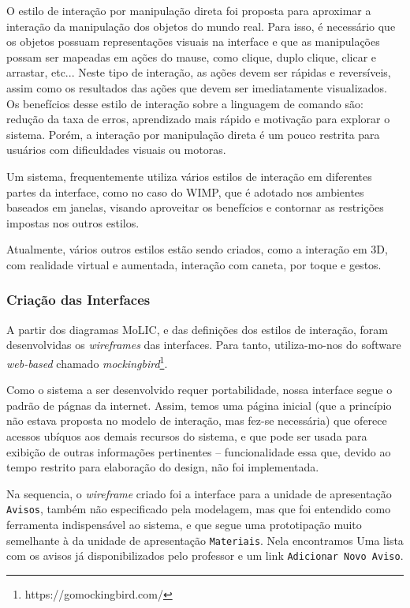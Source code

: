 	O estilo de interação por manipulação direta foi proposta para aproximar a
interação da manipulação dos objetos do mundo real. Para isso, é necessário que
os objetos possuam representações visuais na interface e que as manipulações
possam ser mapeadas em ações do mause, como clique, duplo clique, clicar e
arrastar, etc... Neste tipo de interação, as ações devem ser rápidas e
reversíveis, assim como os resultados das ações que devem ser imediatamente
visualizados. Os benefícios desse estilo de interação sobre a linguagem de
comando são: redução da taxa de erros, aprendizado mais rápido e motivação para
explorar o sistema. Porém, a interação por manipulação direta é um pouco
restrita para usuários com dificuldades visuais ou motoras.

	Um sistema, frequentemente utiliza vários estilos de interação em diferentes
partes da interface, como no caso do WIMP, que é adotado nos ambientes baseados
em janelas, visando aproveitar os benefícios e contornar as restrições impostas
nos outros estilos.

	Atualmente, vários outros estilos estão sendo criados, como a interação em 3D,
com realidade virtual e aumentada, interação com caneta, por toque e gestos.


		\subsubsection{Criação das Interfaces}
			A partir dos diagramas MoLIC, e das definições dos estilos de interação, 
			foram desenvolvidas os \emph{wireframes} das interfaces. Para tanto, utiliza-mo-nos
			do software \emph{web-based} chamado \emph{mockingbird}\footnote{https://gomockingbird.com/}.
			
			Como o sistema a ser desenvolvido requer portabilidade, nossa 
			interface segue o padrão de págnas da internet. Assim, temos uma página 
			inicial (que a princípio não estava proposta no modelo de interação, mas fez-se
			necessária) que oferece acessos ubíquos aos demais recursos do sistema, e que 
			pode ser usada para exibição de outras informações pertinentes -- funcionalidade essa que, devido ao 
			tempo restrito para elaboração do design, não foi implementada.
			
		
			Na sequencia, o \emph{wireframe} criado foi a interface para a unidade de 
			apresentação \texttt{Avisos}, também não especificado pela modelagem, mas que foi 
			entendido como ferramenta indispensável ao sistema, e que segue uma prototipação
			muito semelhante à da unidade de apresentação \texttt{Materiais}. Nela encontramos 
			Uma lista com os avisos já disponibilizados 
			pelo professor e um link \texttt{Adicionar Novo Aviso}.	
		
		
		
		
